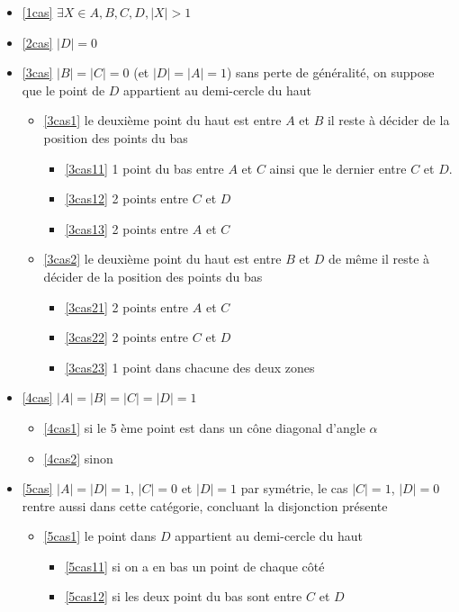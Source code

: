 \begin{itemize}
	\item \ref{1cas} $\exists X \in {A,B,C,D}, |X| > 1$
	\item \ref{2cas} $|D| = 0$
	\item \ref{3cas} $|B| = |C| = 0$ (et $|D| = |A| = 1$)
	sans perte de généralité, on suppose que le point de $D$ appartient au demi-cercle du haut
	\begin{itemize}
		\item \ref{3cas1} le deuxième point du haut est entre $A$ et $B$
		il reste à décider de la position des points du bas
		\begin{itemize}
			\item \ref{3cas11} 1 point du bas entre $A$ et $C$ ainsi que le dernier entre $C$ et $D$.
			\item \ref{3cas12} 2 points entre $C$ et $D$
			\item \ref{3cas13} 2 points entre $A$ et $C$
		\end{itemize}
		\item \ref{3cas2} le deuxième point du haut est entre $B$ et $D$
		de même il reste à décider de la position des points du bas
		\begin{itemize}
			\item \ref{3cas21} 2 points entre $A$ et $C$
			\item \ref{3cas22} 2 points entre $C$ et $D$
			\item \ref{3cas23} 1 point dans chacune des deux zones
		\end{itemize}
	\end{itemize}
	\item \ref{4cas} $|A| = |B| = |C| = |D| = 1$
	\begin{itemize}
		\item \ref{4cas1} si le 5 ème point est dans un cône diagonal d'angle $\alpha$
		\item \ref{4cas2} sinon
	\end{itemize}
	\item \ref{5cas} $|A| = |D| = 1$, $|C| = 0$ et $|D| = 1$
		par symétrie, le cas $|C| = 1$, $|D| = 0$ rentre aussi dans cette catégorie, concluant la disjonction présente
	\begin{itemize}
		\item \ref{5cas1} le point dans $D$ appartient au demi-cercle du haut
		\begin{itemize}
			\item \ref{5cas11} si on a en bas un point de chaque côté
			\item \ref{5cas12} si les deux point du bas sont entre $C$ et $D$

\end{itemize}
\end{itemize}
\end{itemize}
